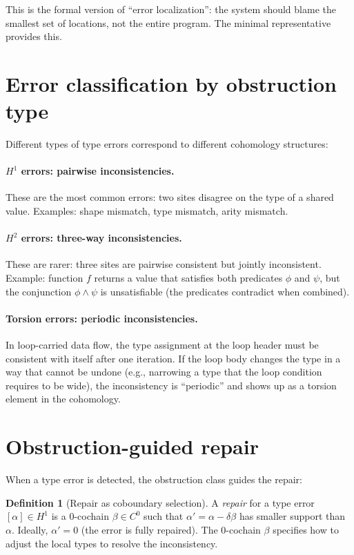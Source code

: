 \documentclass[11pt]{report}
\theoremstyle{definition}
\newtheorem{definition}{Definition}[section]
\theoremstyle{plain}
\begin{document}
This is the formal version of ``error localization'': the system should blame
the smallest set of locations, not the entire program. The minimal
representative provides this.

\section{Error classification by obstruction type}

Different types of type errors correspond to different cohomology structures:

\paragraph{$H^1$ errors: pairwise inconsistencies.}
These are the most common errors: two sites disagree on the type of a shared
value. Examples: shape mismatch, type mismatch, arity mismatch.

\paragraph{$H^2$ errors: three-way inconsistencies.}
These are rarer: three sites are pairwise consistent but jointly
inconsistent. Example: function $f$ returns a value that satisfies both
predicates $\phi$ and $\psi$, but the conjunction $\phi \wedge \psi$ is
unsatisfiable (the predicates contradict when combined).

\paragraph{Torsion errors: periodic inconsistencies.}
In loop-carried data flow, the type assignment at the loop header must be
consistent with itself after one iteration. If the loop body changes the
type in a way that cannot be undone (e.g., narrowing a type that the
loop condition requires to be wide), the inconsistency is ``periodic'' and
shows up as a torsion element in the cohomology.

\section{Obstruction-guided repair}

When a type error is detected, the obstruction class guides the repair:

\begin{definition}[Repair as coboundary selection]
A \emph{repair} for a type error $[\alpha] \in H^1$ is a 0-cochain
$\beta \in C^0$ such that $\alpha' = \alpha - \delta\beta$ has smaller
support than $\alpha$. Ideally, $\alpha' = 0$ (the error is fully repaired).
The 0-cochain $\beta$ specifies how to adjust the local types to resolve the
inconsistency.
\end{definition}
\end{document}
